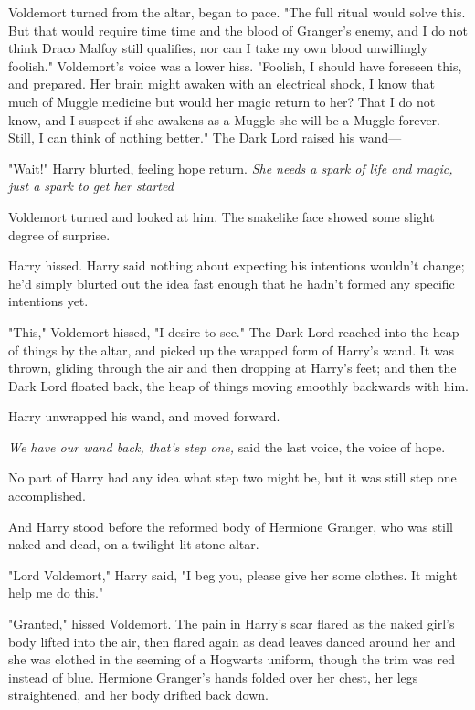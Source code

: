  Voldemort turned from the altar,
began to pace. "The full ritual would solve this. But that would require
time{\el} time and the blood of Granger's enemy, and I do not think Draco
Malfoy still qualifies, nor can I take my own blood unwillingly{\el}
foolish." Voldemort's voice was a lower hiss. "Foolish, I should have foreseen
this, and prepared. Her brain might awaken with an electrical shock, I know
that much of Muggle medicine{\el} but would her magic return to her? That I
do not know, and I suspect if she awakens as a Muggle she will be a Muggle
forever. Still, I can think of nothing better." The Dark Lord raised his wand\mbox{---}

"Wait!" Harry blurted, feeling hope return. \emph{She needs a spark of life and
magic, just a spark to get her started{\el}}

Voldemort turned and looked at him. The snakelike face showed some slight
degree of surprise.

 Harry hissed.  Harry said nothing about
expecting his intentions wouldn't change; he'd simply blurted out the idea fast
enough that he hadn't formed any specific intentions yet.

"This," Voldemort hissed, "I desire to see." The Dark Lord reached into the
heap of things by the altar, and picked up the wrapped form of Harry's wand. It
was thrown, gliding through the air and then dropping at Harry's feet; and then
the Dark Lord floated back, the heap of things moving smoothly backwards with
him.

Harry unwrapped his wand, and moved forward.

\emph{We have our wand back, that's step one,} said the last voice, the voice
of hope.

No part of Harry had any idea what step two might be, but it was still step one
accomplished.

And Harry stood before the reformed body of Hermione Granger, who was still
naked and dead, on a twilight-lit stone altar.

"Lord Voldemort," Harry said, "I beg you, please give her some clothes. It
might help me do this."

"Granted," hissed Voldemort. The pain in Harry's scar flared as the naked
girl's body lifted into the air, then flared again as dead leaves danced around
her and she was clothed in the seeming of a Hogwarts uniform, though the trim
was red instead of blue. Hermione Granger's hands folded over her chest, her
legs straightened, and her body drifted back down.


